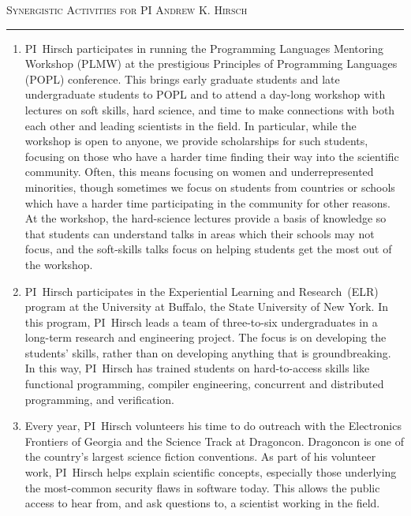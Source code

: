 



\begin{center}
{\LARGE
\textsc{Synergistic Activities for PI Andrew K. Hirsch}
}
\end{center}
\hrule
\vspace{3mm}

\begin{enumerate}
\item PI~Hirsch participates in running the Programming Languages Mentoring Workshop (PLMW) at the prestigious Principles of Programming  Languages (POPL) conference.
  This brings early graduate students and late undergraduate students to POPL and to attend a day-long workshop with lectures on soft skills, hard science, and time to make connections with both each other and leading scientists in the field.
  In particular, while the workshop is open to anyone, we provide scholarships for such students, focusing on those who have a harder time finding their way into the scientific community.
  Often, this means focusing on women and underrepresented minorities, though sometimes we focus on students from countries or schools which have a harder time participating in the community for other reasons.
  At the workshop, the hard-science lectures provide a basis of knowledge so that students can understand talks in areas which their schools may not focus, and the soft-skills talks focus on helping students get the most out of the workshop.
\item PI~Hirsch participates in the Experiential Learning and Research~(ELR) program at the University at Buffalo, the State University of New York.
  In this program, PI~Hirsch leads a team of three-to-six undergraduates in a long-term research and engineering project.
  The focus is on developing the students' skills, rather than on developing anything that is groundbreaking.
  In this way, PI~Hirsch has trained students on hard-to-access skills like functional programming, compiler engineering, concurrent and distributed programming, and verification.
\item Every year, PI~Hirsch volunteers his time to do outreach with the Electronics Frontiers of Georgia and the Science Track at Dragoncon.
  Dragoncon is one of the country's largest science fiction conventions.
  As part of his volunteer work, PI~Hirsch helps explain scientific concepts, especially those underlying the most-common security flaws in software today.
  This allows the public access to hear from, and ask questions to, a scientist working in the field.

\end{enumerate}

